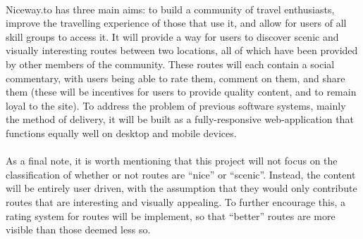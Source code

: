 \ \\
Niceway.to has three main aims: to build a community of travel enthusiasts, improve the travelling experience of those that use it, and allow for users of all skill groups to access it. It will provide a way for users to discover scenic and visually interesting routes between two locations, all of which have been provided by other members of the community. These routes will each contain a social commentary, with users being able to rate them, comment on them, and share them (these will be incentives for users to provide quality content, and to remain loyal to the site). To address the problem of previous software systems, mainly the method of delivery, it will be built as a fully-responsive web-application that functions equally well on desktop and mobile devices. \ \\
\ \\
As a final note, it is worth mentioning that this project will not focus on the classification of whether or not routes are ``nice'' or ``scenic''. Instead, the content will be entirely user driven, with the assumption that they would only contribute routes that are interesting and visually appealing. To further encourage this, a rating system for routes will be implement, so that ``better'' routes are more visible than those deemed less so.

